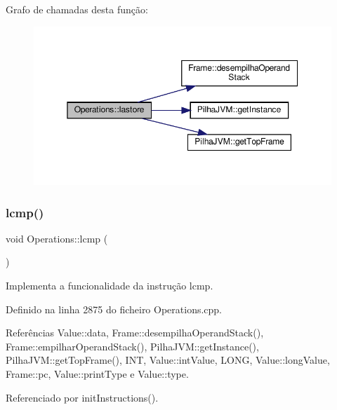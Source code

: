 Grafo de chamadas desta função\+:
\nopagebreak
\begin{figure}[H]
\begin{center}
\leavevmode
\includegraphics[width=350pt]{classOperations_a562813150c331183212c11e5593b83c6_cgraph}
\end{center}
\end{figure}
\mbox{\label{classOperations_a7ad4ad0e417096686b55dde9142b830a}} 
\subsubsection{\texorpdfstring{lcmp()}{lcmp()}}
{\footnotesize\ttfamily void Operations\+::lcmp (\begin{DoxyParamCaption}{ }\end{DoxyParamCaption})\hspace{0.3cm}{\ttfamily [private]}}



Implementa a funcionalidade da instrução lcmp. 



Definido na linha 2875 do ficheiro Operations.\+cpp.



Referências Value\+::data, Frame\+::desempilha\+Operand\+Stack(), Frame\+::empilhar\+Operand\+Stack(), Pilha\+J\+V\+M\+::get\+Instance(), Pilha\+J\+V\+M\+::get\+Top\+Frame(), I\+NT, Value\+::int\+Value, L\+O\+NG, Value\+::long\+Value, Frame\+::pc, Value\+::print\+Type e Value\+::type.



Referenciado por init\+Instructions().

